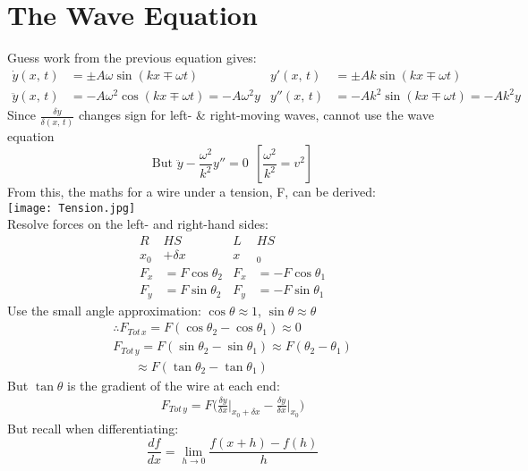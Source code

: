 \documentclass[a4paper, 11pt, fleqn, normalem]{report}
\begin{document}
\section{The Wave Equation}
Guess work from the previous equation gives:
\begin{align*}
    \dot{y}(x,\,t) &= \pm A{\omega}\sin{(kx \mp {\omega}t)}                 & y'(x,\,t) &= \pm Ak\sin{(kx \mp {\omega}t)} \\
    \ddot{y}(x,\,t) &= -A\omega^{2}\cos{(kx \mp {\omega}t)} = -A\omega^{2}y & y''(x,\,t) &= -Ak^{2}\sin{(kx \mp {\omega}t)} = -Ak^{2}y
\end{align*}
Since $\frac{\delta y}{\delta(x,\,t)}$ changes sign for left- \& right-moving waves, cannot use the wave equation
\begin{equation*}
    \text{But } \ddot{y} - \frac{\omega^{2}}{k^{2}}y'' = 0 ~~[\frac{\omega^{2}}{k^{2}} = v^{2}]
\end{equation*}
From this, the maths for a wire under a tension, F, can be derived:\\
\texttt{[image: Tension.jpg]} \\
Resolve forces on the left- and right-hand sides:
\begin{align*}
         R&HS                  &      L&HS                   \\
    x_{0} &+ {\delta}x         &      x&_{0}                 \\
    F_{x} &= F\cos{\theta_{2}} & F_{x} &= -F\cos{\theta_{1}} \\
    F_{y} &= F\sin{\theta_{2}} & F_{y} &= -F\sin{\theta_{1}}
\end{align*}
Use the small angle approximation: $\cos{\theta} \approx 1$, $\sin{\theta} \approx \theta$
\begin{gather*}
    \therefore F_{Tot\,x} = F(\cos{\theta_{2}} - \cos{\theta_{1}}) \approx 0 \\
    F_{Tot\,y} = F(\sin{\theta_{2}} - \sin{\theta_{1}}) \approx F(\theta_{2} - \theta_{1}) \\
    ~~~~~~~\,\approx F(\tan{\theta_{2}} - \tan{\theta_{1}})
\end{gather*}
But $\tan{\theta}$ is the gradient of the wire at each end:
\begin{gather*}
    F_{Tot\,y} = F\Big(\frac{{\delta}y}{{\delta}x}\Big|_{x_{0} + {\delta}x} - \frac{{\delta}y}{{\delta}x}\Big|_{x_{0}}\Big)
\end{gather*}
But recall when differentiating:
\begin{equation*}
    \frac{df}{dx} = \lim_{h\to0} \frac{f(x+h) - f(h)}{h}
\end{equation*}
\end{document}
